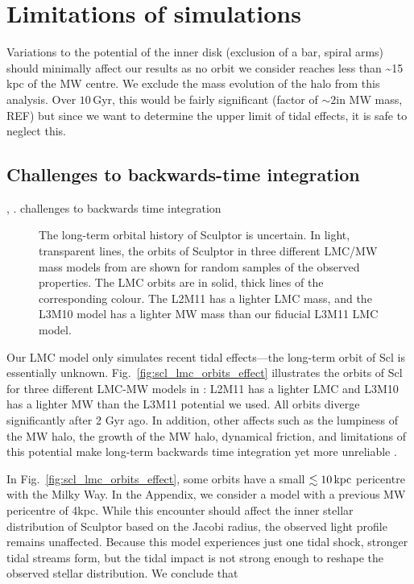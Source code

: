 \section{Limitations of simulations}\label{limitations-of-simulations}

Variations to the potential of the inner disk (exclusion of a bar,
spiral arms) should minimally affect our results as no orbit we consider
reaches less than \textasciitilde15 kpc of the MW centre. We exclude the
mass evolution of the halo from this analysis. Over \(10\,\)Gyr, this
would be fairly significant (factor of \(\sim 2\)in MW mass, REF) but
since we want to determine the upper limit of tidal effects, it is safe
to neglect this.

\subsection{Challenges to backwards-time
integration}\label{sec:scl_orbit_variability}

\citet{dsouza+bell2022}, \citet{santistevan+2024}. challenges to
backwards time integration

\begin{figure}
\centering
{}
\caption[Sculptor Orbits with LMC]{The long-term orbital history of
Sculptor is uncertain. In light, transparent lines, the orbits of
Sculptor in three different LMC/MW mass models from \citet{vasiliev2024}
are shown for random samples of the observed properties. The LMC orbits
are in solid, thick lines of the corresponding colour. The L2M11 has a
lighter LMC mass, and the L3M10 model has a lighter MW mass than our
fiducial L3M11 LMC model.}\label{fig:scl_lmc_orbits_mass}
\end{figure}

Our LMC model only simulates recent tidal effects---the long-term orbit
of Scl is essentially unknown. Fig.~\ref{fig:scl_lmc_orbits_effect}
illustrates the orbits of Scl for three different LMC-MW models in
\citet{vasiliev2024}: L2M11 has a lighter LMC and L3M10 has a lighter MW
than the L3M11 potential we used. All orbits diverge significantly after
2 Gyr ago. In addition, other affects such as the lumpiness of the MW
halo, the growth of the MW halo, dynamical friction, and limitations of
this potential make long-term backwards time integration yet more
unreliable \citep[e.g.,][]{dsouza+bell2022}.

In Fig.~\ref{fig:scl_lmc_orbits_effect}, some orbits have a small
\(\lesssim 10\,{\rm kpc}\) pericentre with the Milky Way. In the Appendix, we
consider a model with a previous MW pericentre of 4kpc. While this
encounter should affect the inner stellar distribution of Sculptor based
on the Jacobi radius, the observed light profile remains unaffected.
Because this model experiences just one tidal shock, stronger tidal
streams form, but the tidal impact is not strong enough to reshape the
observed stellar distribution. We conclude that

